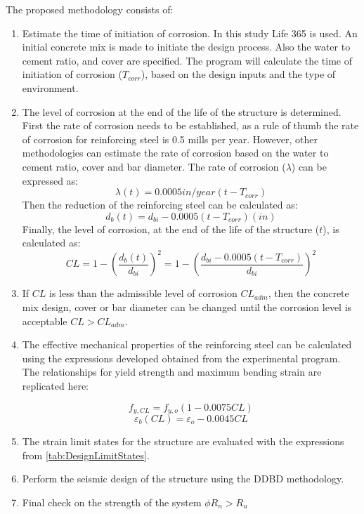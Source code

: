 The proposed methodology consists of:
\begin{enumerate}
    \item Estimate the time of initiation of corrosion. In this study Life 365 is used. An initial concrete mix is made to initiate the design process. Also the water to cement ratio, and cover are specified. The program will calculate the time of initiation of corrosion ($T_{corr}$), based on the design inputs and the type of environment.
    \item The level of corrosion at the end of the life of the structure is determined. First the rate of corrosion needs to be established, as a rule of thumb the rate of corrosion for reinforcing steel is 0.5 mills per year. However, other methodologies can estimate the rate of corrosion based on the water to cement ratio, cover and bar diameter\cite{Weyers1994}\cite{Thoft-Christensen}. The rate of corrosion ($\lambda$) can be expressed as:
    \begin{equation}
        \lambda(t)=0.0005 in/year (t-T_{corr})
    \end{equation}
    Then the reduction of the reinforcing steel can be calculated as:
    \begin{equation}
    d_{b}(t)=d_{bi}-0.0005(t-T_{corr}) (in)
    \end{equation}
    Finally, the level of corrosion, at the end of the life of the structure ($t$), is calculated as:
    \begin{equation}
    CL=1-\left(\frac{d_{b}(t)}{d_{bi}}\right)^2=1-\left(\frac{d_{bi}-0.0005(t-T_{corr})}{d_{bi}}\right)^2
    \end{equation}
    
    \item If $CL$ is less than the admissible level of corrosion $CL_{adm}$, then the concrete mix design, cover or bar diameter can be changed until the corrosion level is acceptable $CL>CL_{adm}$.
    
    \item The effective mechanical properties of the reinforcing steel can be calculated using the expressions developed obtained from the experimental program. The relationships for yield strength and maximum bending strain are replicated here:
    
    \begin{equation}
        f_{y,CL} = f_{y,o}(1-0.0075CL)
        \label{eq.Calderon_Fy_vs_CL_06}
    \end{equation}
    \begin{equation}
        \varepsilon_{b}(CL) = \varepsilon_{o}-0.0045CL
        \label{eq.Calderon_eb_vs_CL_06}
    \end{equation}
    \item The strain limit states for the structure are evaluated with the expressions from \ref{tab:DesignLimitStates}.
    \item Perform the seismic design of the structure using the DDBD methodology.
    \item Final check on the strength of the system $\phi R_{n}>R_{u}$
\end{enumerate}

